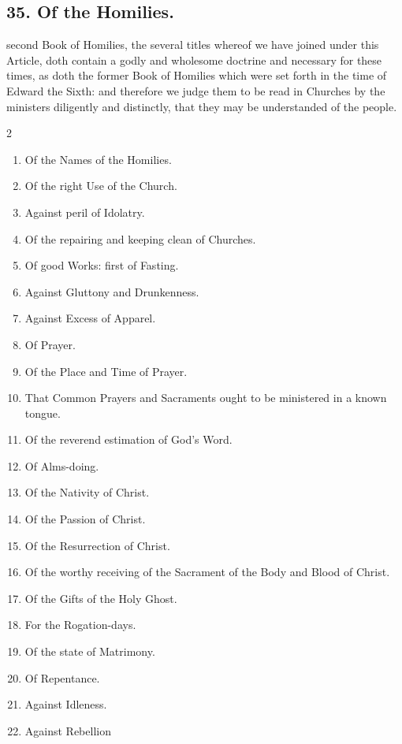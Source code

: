 \subsection{35. Of the Homilies.}
 second Book of Homilies, the several titles whereof we have joined under this Article, doth contain a godly and wholesome doctrine and necessary for these times, as doth the former Book of Homilies which were set forth in the time of Edward the Sixth: and therefore we judge them to be read in Churches by the ministers diligently and distinctly, that they may be understanded of the people.
\begin{multicols}{2}
\begin{enumerate}
\item Of the Names of the Homilies.
\item Of the right Use of the Church.
\item Against peril of Idolatry.
\item Of the repairing and keeping clean of Churches.
\item Of good Works: first of Fasting.
\item Against Gluttony and Drunkenness.
\item Against Excess of Apparel.
\item Of Prayer.
\item Of the Place and Time of Prayer.
\item That Common Prayers and Sacraments ought to be ministered in a known tongue.
\item Of the reverend estimation of God's Word.
\item Of Alms-doing.
\item Of the Nativity of Christ.
\item Of the Passion of Christ.
\item Of the Resurrection of Christ.
\item Of the worthy receiving of the Sacrament of the Body and Blood of Christ.
\item Of the Gifts of the Holy Ghost.
\item For the Rogation-days.
\item Of the state of Matrimony.
\item Of Repentance.
\item Against Idleness.
\item Against Rebellion
\end{enumerate}
\end{multicols}

